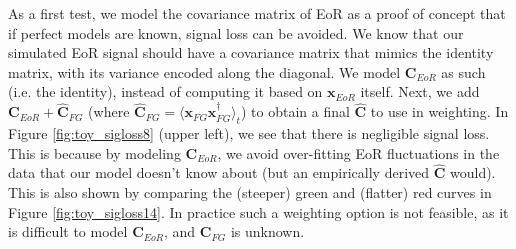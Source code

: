 \documentclass[preprint2,numberedappendix,tighten]{aastex6}  %
\begin{document}
As a first test, we model the covariance matrix of EoR as a proof of concept that if perfect models are known, signal loss can be 
avoided. We know that our simulated EoR signal should have a covariance matrix that mimics the identity matrix, with its 
variance encoded along the diagonal. We model $\textbf{C}_{EoR}$ as such (i.e. the identity), instead of computing it based on $\textbf{x}
_{EoR}$ itself. Next, we add $\textbf{C}_{EoR} + \widehat{\textbf{C}}_{FG}$ (where $\widehat{\textbf{C}}_{FG} = \langle\textbf{x}_{FG}
\textbf{x}_{FG}^{\dagger}\rangle_{t}$) to obtain a final $\widehat{\textbf{C}}$ to use in weighting. In Figure \ref{fig:toy_sigloss8} (upper 
left), we see that there is negligible signal loss. This is because by modeling $\textbf{C}_{EoR}$, we avoid over-fitting EoR fluctuations in the data that our model doesn't know about (but an empirically derived $\widehat{\textbf{C}}$ would). This is also shown by comparing the (steeper) green and (flatter) red curves in Figure \ref{fig:toy_sigloss14}. In practice such a weighting option is not feasible, as it is difficult to model $\textbf{C}_{EoR}$, and $\textbf{C}_{FG}$ is unknown.
\end{document}
